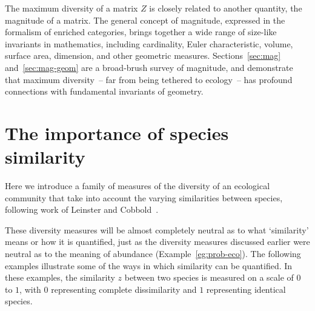 The maximum diversity of a matrix $Z$ is closely related to another
quantity, the magnitude of a matrix.  The general concept of magnitude,
expressed in the formalism of enriched categories, brings together a wide
range of size-like invariants in mathematics, including cardinality, Euler
characteristic, volume, surface area, dimension, and other geometric
measures.  Sections~\ref{sec:mag} and~\ref{sec:mag-geom} are a broad-brush
survey of magnitude, and demonstrate that maximum diversity~-- far from
being tethered to ecology~-- has profound connections with 
fundamental invariants of geometry.


\section{The importance of species similarity}


Here we introduce a family of measures of the diversity of an ecological
community that take into account the varying similarities between species, 
following work of Leinster and Cobbold~\cite{MDISS}.%
% 

These diversity measures will be almost completely neutral as to what
`similarity' means or how it is quantified, just as the diversity measures
discussed earlier were neutral as to the meaning of abundance
(Example~\ref{eg:prob-eco}).  The following examples illustrate some of the
ways in which similarity can be quantified.  In these
examples, the similarity%
%
% 
$z$ between two species is measured on a scale of $0$ to $1$,
with $0$ representing complete dissimilarity and $1$ representing identical
species.

